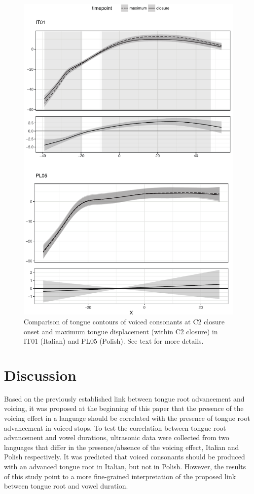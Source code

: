 \documentclass[authoryear, twocolumn]{elsarticle}
\begin{document}
\begin{figure}
    \centering
    \includegraphics[height=.9\textheight]{fig/voiced.pdf}
    \caption{Comparison of tongue contours of voiced consonants at C2 closure onset and maximum tongue displacement (within C2 closure) in IT01 (Italian) and PL05 (Polish). See text for more details.}
    \label{f:voiced}
\end{figure}

\section{Discussion}\label{discussion}

\label{s:discussion}

Based on the previously established link between tongue root advancement
and voicing, it was proposed at the beginning of this paper that the
presence of the voicing effect in a language should be correlated with
the presence of tongue root advancement in voiced stops. To test the
correlation between tongue root advancement and vowel durations,
ultrasonic data were collected from two languages that differ in the
presence/absence of the voicing effect, Italian and Polish respectively.
It was predicted that voiced consonants should be produced with an
advanced tongue root in Italian, but not in Polish. However, the results
of this study point to a more fine-grained interpretation of the
proposed link between tongue root and vowel duration.
\end{document}
